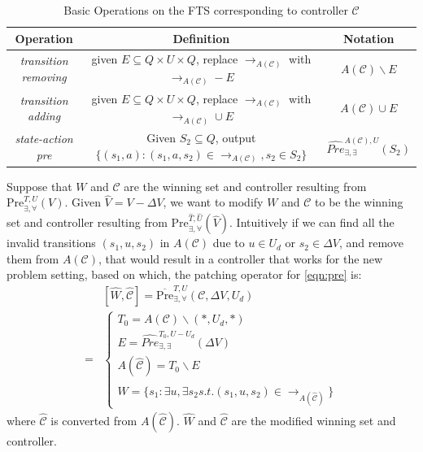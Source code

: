 \begin{table}
	\centering
	\caption{Basic Operations on the FTS corresponding to controller $ \mathcal{C} $}
	\begin{tabular}{ccc}
		\hline
		Operation & Definition & Notation\\
		\hline
		\emph{transition removing} & given $ E\subseteq Q\times U\times Q $, replace $ \rightarrow_{A(\mathcal{C})} $ with $\rightarrow_{A(\mathcal{C})} - E$ & $ A(\mathcal{C})\backslash E $\\
		\emph{transition adding} & given $ E\subseteq Q\times U\times Q $, replace $ \rightarrow_{A(\mathcal{C})} $ with $ \rightarrow_{A(\mathcal{C})}\cup E $ & $ A(\mathcal{C})\cup E $\\
		\emph{state-action pre} &  Given $ S_2\subseteq Q $, output $ \{(s_1,a): (s_1,a,s_2)\in \rightarrow_{A(\mathcal{C})}, s_2\in S_2\} $ & $ \widehat{Pre}^{A(\mathcal{C}),U}_{\exists,\exists}(S_2) $\\
		\hline
	\end{tabular}
	\label{tab:oper}
\end{table}


Suppose that  $ W $ and $ \mathcal{C} $ are the winning set and controller resulting from $ \text{Pre}_{\exists,\forall}^{T, U}(V) $. Given $ \widehat{V}= V-\Delta V $, we want to modify $ W $ and $ \mathcal{C} $ to be the winning set and controller resulting from $ \text{Pre}_{\exists,\forall}^{\widehat{T},\widehat{U}}(\widehat{V}) $. Intuitively if we can find all the invalid transitions $ (s_1,u,s_2) $ in $ A(\mathcal{C}) $ due to $ u\in U_d $ or $ s_2\in\Delta V $, and remove them from $ A(\mathcal{C}) $, that would result in a controller that works for the new problem setting, based on which, the patching operator for \eqref{eqn:pre} is:
{\small
\begin{align}
&[\widehat{W},\widehat{\mathcal{C}}]=\overline{\text{Pre}}_{\exists,\forall}^{T, U}(\mathcal{C},\Delta V,U_d)\nonumber\\
=&\begin{cases} 
T_{0} = A(\mathcal{C})\backslash (*,U_d,*)\\
E =  \widehat{Pre}^{T_0,U-U_d}_{\exists,\exists}(\Delta V)\\
A(\widehat{\mathcal{C}}) = T_{0}\backslash E\\
\widehat{W} = \{s_1: \exists u, \exists s_2 s.t. (s_1,u, s_2)\in \rightarrow_{A(\widehat{\mathcal{C}})} \}
\end{cases}\label{patch-pre}
\end{align}}
where $ \widehat{\mathcal{C}} $ is converted from $ A(\widehat{\mathcal{C}}) $. $ \widehat{W} $ and $ \widehat{\mathcal{C}} $ are the modified winning set and controller.

